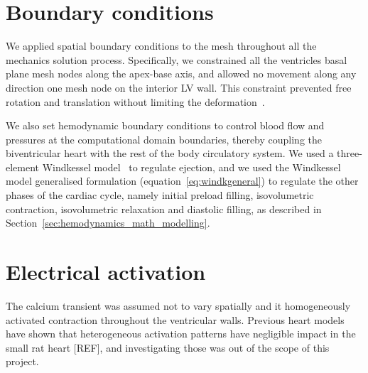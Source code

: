 %
%
%
\section{Boundary conditions}\label{sec:boundaryconditions}
We applied spatial boundary conditions to the mesh throughout all the mechanics solution process. Specifically, we constrained all the ventricles basal plane mesh nodes along the apex-base axis, and allowed no movement along any direction one mesh node on the interior LV wall. This constraint prevented free rotation and translation without limiting the deformation~\cite{Land:2012}.

\vspace{0.2cm}
We also set hemodynamic boundary conditions to control blood flow and pressures at the computational domain boundaries, thereby coupling the biventricular heart with the rest of the body circulatory system. We used a three-element Windkessel model~\cite{Westerhof:1971} to regulate ejection, and we used the Windkessel model generalised formulation (equation~\eqref{eq:windkgeneral}) to regulate the other phases of the cardiac cycle, namely initial preload filling, isovolumetric contraction, isovolumetric relaxation and diastolic filling, as described in Section~\ref{sec:hemodynamics_math_modelling}.


%
%
%
\section{Electrical activation}\label{sec:electricalactivation}
The calcium transient was assumed not to vary spatially and it homogeneously activated contraction throughout the ventricular walls. Previous heart models
have shown that heterogeneous activation patterns have negligible impact in the small rat heart [REF], and investigating those was out of the scope of this project.
